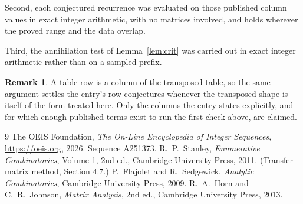 \documentclass[11pt,a4paper]{article}
\theoremstyle{plain}
\theoremstyle{definition}
\newtheorem{remark}[theorem]{Remark}
\begin{document}
Second, each conjectured recurrence was evaluated on those published column values in exact
integer arithmetic, with no matrices involved, and holds wherever the proved range and the
data overlap.

Third, the annihilation test of Lemma~\ref{lem:crit} was carried out in exact integer
arithmetic rather than on a sampled prefix.

\begin{remark}
A table row is a column of the transposed table, so the same argument settles the entry's row
conjectures whenever the transposed shape is itself of the form treated here. Only the columns
the entry states explicitly, and for which enough published terms exist to run the first check
above, are claimed.
\end{remark}

\begin{thebibliography}{9}
 The OEIS Foundation, \emph{The On-Line Encyclopedia of Integer
Sequences}, \url{https://oeis.org}, 2026. Sequence A251373.
 R.~P.~Stanley, \emph{Enumerative Combinatorics}, Volume 1, 2nd ed.,
Cambridge University Press, 2011. (Transfer-matrix method, Section 4.7.)
 P.~Flajolet and R.~Sedgewick, \emph{Analytic Combinatorics}, Cambridge
University Press, 2009.
 R.~A.~Horn and C.~R.~Johnson, \emph{Matrix Analysis}, 2nd ed., Cambridge
University Press, 2013.
\end{thebibliography}
\end{document}

